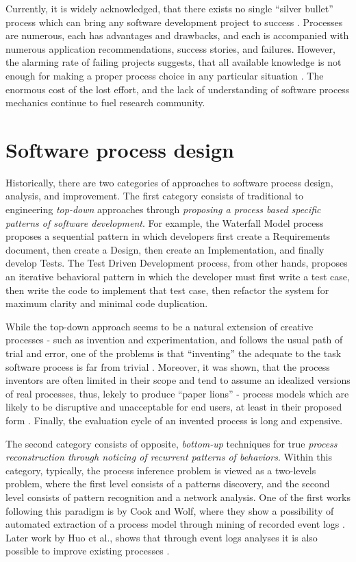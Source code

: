Currently, it is widely acknowledged, that there exists no single ``silver bullet'' process which can bring any 
software development project to success \cite{citeulike:1986013}. Processes are numerous, each has advantages 
and drawbacks, and each is accompanied with numerous application recommendations, success stories, and 
failures. However, the alarming rate of failing projects suggests, that all available knowledge is not enough for
making a proper process choice in any particular situation \cite{citeulike:12550665}. 
The enormous cost of the lost effort, and the lack of understanding of software process mechanics continue 
to fuel research community. 

\section{Software process design}\label{section_software_process}
Historically, there are two categories of approaches to software process design, analysis, and improvement. 
The first category consists of traditional to engineering \textit{top-down} approaches through \textit{proposing a
process based specific patterns of software development}. 
For example, the Waterfall Model process proposes a sequential pattern in which developers first create a 
Requirements document, then create a Design, then create an Implementation, and finally develop Tests. 
The Test Driven Development process, from other hands, proposes an iterative behavioral pattern in which
the developer must first write a test case, then write the code to implement that test case, then refactor the 
system for maximum clarity and minimal code duplication. 

While the top-down approach seems to be a natural extension of creative processes - such as invention
and experimentation, and follows the usual path of trial and error, one of the problems is that ``inventing''
the adequate 
to the task software process is far from trivial \cite{citeulike:5043104} \cite{citeulike:1986013}. 
Moreover, it was shown, that the process inventors are often limited in their scope and tend to assume an idealized
versions of real processes, thus, lekely to produce ``paper lions'' - process models which are likely to be
disruptive and unacceptable for end users, at least in their proposed form \cite{citeulike:9758924}. 
Finally, the evaluation cycle of an invented process is long and expensive. 

The second category consists of opposite, \textit{bottom-up} techniques for true \textit{process reconstruction 
through noticing of recurrent patterns of behaviors}. 
Within this category, typically, the process inference problem is viewed 
as a two-levels problem, where the first level consists of a patterns discovery, and the 
second level consists of pattern recognition and a network analysis.
One of the first works following this paradigm is by Cook and Wolf, where they show a
possibility of automated extraction of a process model through mining of recorded event logs
\cite{citeulike:328044} \cite{citeulike:5120757} \cite{citeulike:5128143}. 
Later work by Huo et al., shows that through event logs analyses it is also possible to 
improve existing processes \cite{citeulike:7691059} \cite{citeulike:7690766}. 

